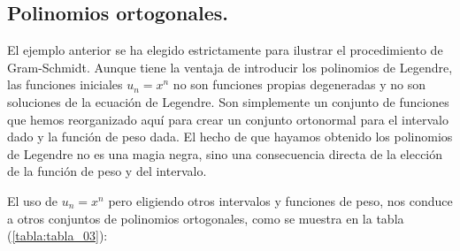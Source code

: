 \subsection{Polinomios ortogonales.}
El ejemplo anterior se ha elegido estrictamente para ilustrar el procedimiento de Gram-Schmidt. Aunque tiene la ventaja de introducir los polinomios de Legendre, las funciones iniciales $u_{n} = x^{n}$ no son funciones propias degeneradas y no son soluciones de la ecuación de Legendre. Son simplemente un conjunto de funciones que hemos reorganizado aquí para crear un conjunto ortonormal para el intervalo dado y la función de peso dada. El hecho de que hayamos obtenido los polinomios de Legendre no es una magia negra, sino una consecuencia directa de la elección de la función de peso y del intervalo.
\par
El uso de $u_{n} = x^{n}$ pero eligiendo otros intervalos y funciones de peso, nos conduce a otros conjuntos de polinomios ortogonales, como se muestra en la tabla (\ref{tabla:tabla_03}):
